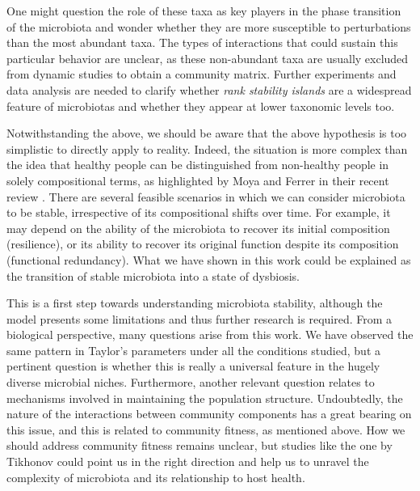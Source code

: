 One might  question the role of these taxa as key players in the phase transition of the microbiota and wonder whether they are more susceptible to perturbations than the most abundant taxa. The types of interactions that could sustain this particular behavior are unclear, as these non-abundant taxa are usually excluded from dynamic studies to obtain a community matrix. Further experiments and data analysis are needed to clarify whether \emph{rank stability islands} are a widespread feature of microbiotas and whether they appear at lower taxonomic levels too.

Notwithstanding the above, we should be aware that the above hypothesis is too simplistic to directly apply to reality. Indeed, the situation is more complex than the idea that healthy people can be distinguished from non-healthy people in solely compositional terms, as highlighted by Moya and Ferrer in their recent review \cite{Moya_trends}. There are several feasible scenarios in which we can consider microbiota to be stable, irrespective of its compositional shifts over time. For example, it may depend on the ability of the microbiota to recover its initial composition (resilience), or its ability to recover its original function despite its composition (functional redundancy). What we have shown in this work could be explained as the transition of stable microbiota into a state of dysbiosis.  

This is a first step towards understanding microbiota stability, although the model presents some limitations and thus further research is required. From a biological perspective, many questions arise from this work. We have observed the same pattern in Taylor’s parameters under all the conditions studied, but a pertinent question is whether this is really a universal feature in the hugely diverse microbial niches. Furthermore, another relevant question relates to mechanisms involved in maintaining the population structure.  Undoubtedly, the nature of the interactions between community components has a great bearing on this issue, and this is related to community fitness, as mentioned above. How we should address community fitness remains unclear, but studies like the one by Tikhonov  \cite{tikhonov} could point us in the right direction and help us to unravel the complexity of microbiota and its relationship to host health.